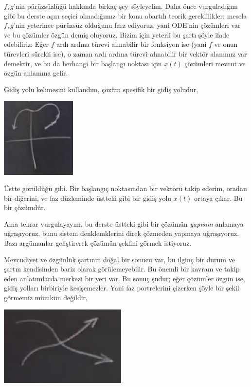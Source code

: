 \documentclass[12pt,fleqn]{article}\usepackage{../../common}
\begin{document}
$f,g$'nin pürüzsüzlüğü hakkında birkaç şey söyleyelim. Daha önce vurguladığım
gibi bu derste aşırı seçici olmadığımız bir konu abartılı teorik gereklilikler;
mesela $f,g$'nin yeterince pürüzsüz olduğunu farz ediyoruz, yani ODE'nin
çözümleri var ve bu çözümler özgün demiş oluyoruz. Bizim için yeterli bu şartı
şöyle ifade edebiliriz: Eğer $\underline{f}$ ardı ardına türevi alınabilir bir
fonksiyon ise (yani $\underline{f}$ ve onun türevleri sürekli ise), o zaman ardı
ardına türevi alınabilir bir vektör alanımız var demektir, ve bu da herhangi bir
başlangı noktası için $\underline{x}(t)$ çözümleri mevcut ve özgün anlamına
gelir.

Gidiş yolu kelimesini kullandım, çözüm spesifik bir gidiş yoludur,

\includegraphics[height=4cm]{05_02.png}

Üstte görüldüğü gibi. Bir başlangıç noktasından bir vektörü takip ederim, oradan
bir diğerini, ve faz düzleminde üstteki gibi bir gidiş yolu $x(t)$ ortaya
çıkar. Bu bir çözümdür.

Ama tekrar vurgulayayım, bu derste üstteki gibi bir çözümün {\em yapısını}
anlamaya uğraşıyoruz, bunu sistem denklemklerini direk çözmeden yapmaya
uğraşıyoruz. Bazı argümanlar geliştirerek çözümün şeklini görmek istiyoruz.

Mevcudiyet ve özgünlük şartının doğal bir sonucu var, bu ilginç bir durum ve
şartın kendisinden bariz olarak görülemeyebilir. Bu önemli bir kavram ve takip
eden anlatımlarda merkezi bir yeri var. Bu sonuç şudur; eğer çözümler özgün ise,
gidiş yolları birbiriyle kesişemezler. Yani faz portrelerini çizerken şöyle bir
şekil görmemiz mümkün değildir,

\includegraphics[height=4cm]{05_03.png}
\end{document}
